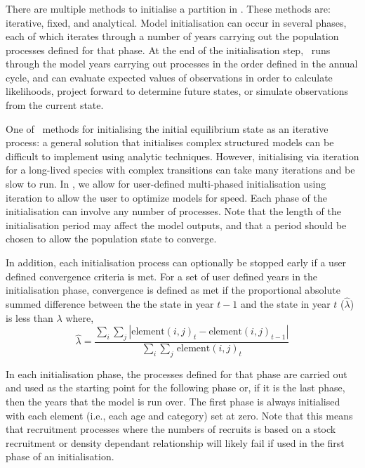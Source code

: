 \subsubsection{}

There are multiple methods to initialise a partition in \CNAME. These methods are: iterative, fixed, and analytical. Model initialisation can occur in several phases, each of which iterates through a number of years carrying out the population processes defined for that phase. At the end of the initialisation step, \CNAME\ runs through the model years carrying out processes in the order defined in the annual cycle, and can evaluate expected values of observations in order to calculate likelihoods, project forward to determine future states, or simulate observations from the current state.

One of \CNAME\ methods for initialising the initial equilibrium state as an iterative process: a general solution that initialises complex structured models can be difficult to implement using analytic techniques. However, initialising via iteration for a long-lived species with complex transitions can take many iterations and be slow to run. In \CNAME, we allow for user-defined multi-phased initialisation using iteration to allow the user to optimize models for speed. Each phase of the initialisation can involve any number of processes. Note that the length of the initialisation period may affect the model outputs, and that a period should be chosen to allow the population state to converge.

In addition, each initialisation process can optionally be stopped early if a user defined convergence criteria is met. For a set of user defined years in the initialisation phase, convergence is defined as met if the proportional absolute summed difference between the the state in year $t-1$ and the state in year $t$ ($\widehat{\lambda}$) is less than $\lambda$ where, 
\begin{equation}
  \widehat{\lambda} = \frac{\sum\limits_{i} \sum\limits_{j} \left|\text{element}(i,j)_t - \text{element}(i,j)_{t-1} \right|}{\sum\limits_{i} \sum\limits_{j} \frac{}{}\text{element}(i,j)_t}
\end{equation}

In each initialisation phase, the processes defined for that phase are carried out and used as the starting point for the following phase or, if it is the last phase, then the years that the model is run over. The first phase is always initialised with each element (i.e., each age and category) set at zero. Note that this means that recruitment processes where the numbers of recruits is based on a stock recruitment or density dependant relationship will likely fail if used in the first phase of an initialisation. 

